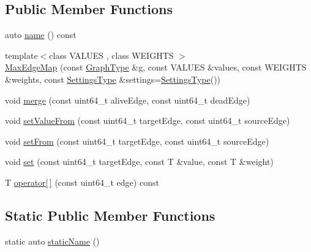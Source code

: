 \subsection*{Public Member Functions}
\begin{DoxyCompactItemize}
\item 
auto \hyperlink{classnifty_1_1graph_1_1agglo_1_1merge__rules_1_1MaxEdgeMap_a44295606b3c1250d5994dde8f6dda2a1}{name} () const
\item 
{\footnotesize template$<$class V\+A\+L\+U\+ES , class W\+E\+I\+G\+H\+TS $>$ }\\\hyperlink{classnifty_1_1graph_1_1agglo_1_1merge__rules_1_1MaxEdgeMap_aa970480b4cf10bb00c507e7d9161feff}{Max\+Edge\+Map} (const \hyperlink{classnifty_1_1graph_1_1agglo_1_1merge__rules_1_1MaxEdgeMap_a7b996d3f4737ff2b77cca85520e62510}{Graph\+Type} \&g, const V\+A\+L\+U\+ES \&values, const W\+E\+I\+G\+H\+TS \&weights, const \hyperlink{classnifty_1_1graph_1_1agglo_1_1merge__rules_1_1MaxEdgeMap_a7123769ad8199741d682d9de6be59ca3}{Settings\+Type} \&settings=\hyperlink{classnifty_1_1graph_1_1agglo_1_1merge__rules_1_1MaxEdgeMap_a7123769ad8199741d682d9de6be59ca3}{Settings\+Type}())
\item 
void \hyperlink{classnifty_1_1graph_1_1agglo_1_1merge__rules_1_1MaxEdgeMap_a924065ef7a925db0fcd7126c5c4c5847}{merge} (const uint64\+\_\+t alive\+Edge, const uint64\+\_\+t dead\+Edge)
\item 
void \hyperlink{classnifty_1_1graph_1_1agglo_1_1merge__rules_1_1MaxEdgeMap_afb967cd939fd955475e1cfdd687940e0}{set\+Value\+From} (const uint64\+\_\+t target\+Edge, const uint64\+\_\+t source\+Edge)
\item 
void \hyperlink{classnifty_1_1graph_1_1agglo_1_1merge__rules_1_1MaxEdgeMap_aca714607ca3a7a8b53229174b211501d}{set\+From} (const uint64\+\_\+t target\+Edge, const uint64\+\_\+t source\+Edge)
\item 
void \hyperlink{classnifty_1_1graph_1_1agglo_1_1merge__rules_1_1MaxEdgeMap_a89fedf36c75b3ec21c34d88a2732882b}{set} (const uint64\+\_\+t target\+Edge, const T \&value, const T \&weight)
\item 
T \hyperlink{classnifty_1_1graph_1_1agglo_1_1merge__rules_1_1MaxEdgeMap_aae0dad0ea0b97c0acea36bba4c772052}{operator\mbox{[}$\,$\mbox{]}} (const uint64\+\_\+t edge) const
\end{DoxyCompactItemize}
\subsection*{Static Public Member Functions}
\begin{DoxyCompactItemize}
\item 
static auto \hyperlink{classnifty_1_1graph_1_1agglo_1_1merge__rules_1_1MaxEdgeMap_afa3c23046cdc560e647781cabcd43af4}{static\+Name} ()
\end{DoxyCompactItemize}


